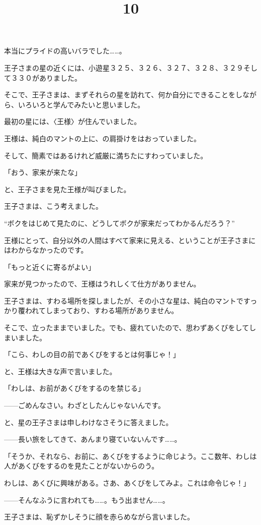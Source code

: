 本当にプライドの高いバラでした……。

\title{10}

王子さまの星の近くには、小遊星３２５、３２６、３２７、３２８、３２９そして３３０がありました。

そこで、王子さまは、まずそれらの星を訪れて、何か自分にできることをしながら、いろいろと学んでみたいと思いました。

最初の星には、〈王様〉が住んでいました。

王様は、純白のマントの上に、の肩掛けをはおっていました。

そして、簡素ではあるけれど威厳に満ちたにすわっていました。

「おう、家来が来たな」

と、王子さまを見た王様が叫びました。

王子さまは、こう考えました。

“ボクをはじめて見たのに、どうしてボクが家来だってわかるんだろう？”

王様にとって、自分以外の人間はすべて家来に見える、ということが王子さまにはわからなかったのです。

「もっと近くに寄るがよい」

家来が見つかったので、王様はうれしくて仕方がありません。

王子さまは、すわる場所を探しましたが、その小さな星は、純白のマントですっかり覆われてしまっており、すわる場所がありません。

そこで、立ったままでいました。でも、疲れていたので、思わずあくびをしてしまいました。

「こら、わしの目の前であくびをするとは何事じゃ！」

と、王様は大きな声で言いました。

「わしは、お前があくびをするのを禁じる」


——ごめんなさい。わざとしたんじゃないんです。

と、星の王子さまは申しわけなさそうに答えました。

——長い旅をしてきて、あんまり寝ていないんです……。

「そうか、それなら、お前に、あくびをするように命じよう。ここ数年、わしは人があくびをするのを見たことがないからのう。

わしは、あくびに興味がある。さあ、あくびをしてみよ。これは命令じゃ！」

——そんなふうに言われても……。もう出ません……。

王子さまは、恥ずかしそうに顔を赤らめながら言いました。

